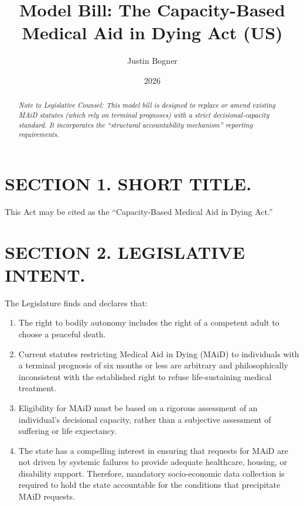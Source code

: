 \documentclass[11pt]{article}
\title{Model Bill: The Capacity-Based Medical Aid in Dying Act (US)}
\author{Justin Bogner}
\date{2026}
\begin{document}
\maketitle

\begin{abstract}
\noindent \textit{Note to Legislative Counsel: This model bill is designed to replace or amend existing MAiD statutes (which rely on terminal prognoses) with a strict decisional-capacity standard. It incorporates the ``structural accountability mechanism'' reporting requirements.}
\end{abstract}

\section*{SECTION 1. SHORT TITLE.}
This Act may be cited as the ``Capacity-Based Medical Aid in Dying Act.''

\section*{SECTION 2. LEGISLATIVE INTENT.}
The Legislature finds and declares that:
\begin{enumerate}
    \item[(a)] The right to bodily autonomy includes the right of a competent adult to choose a peaceful death.
    \item[(b)] Current statutes restricting Medical Aid in Dying (MAiD) to individuals with a terminal prognosis of six months or less are arbitrary and philosophically inconsistent with the established right to refuse life-sustaining medical treatment.
    \item[(c)] Eligibility for MAiD must be based on a rigorous assessment of an individual’s decisional capacity, rather than a subjective assessment of suffering or life expectancy.
    \item[(d)] The state has a compelling interest in ensuring that requests for MAiD are not driven by systemic failures to provide adequate healthcare, housing, or disability support. Therefore, mandatory socio-economic data collection is required to hold the state accountable for the conditions that precipitate MAiD requests.
\end{enumerate}
\end{document}
